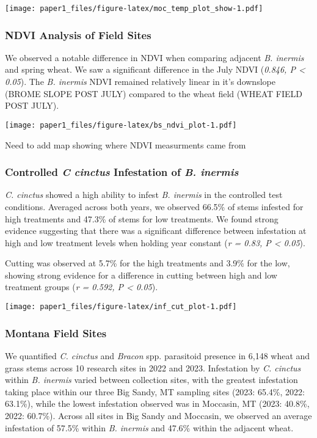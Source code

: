 \documentclass[
]{article}
\begin{document}
\texttt{[image: paper1\_files/figure-latex/moc\_temp\_plot\_show-1.pdf]}

\subsubsection{NDVI Analysis of Field
Sites}\label{ndvi-analysis-of-field-sites}

We observed a notable difference in NDVI when comparing adjacent
\emph{B. inermis} and spring wheat. We saw a significant difference in
the July NDVI (\emph{0.846, P \textless{} 0.05}). The \emph{B. inermis}
NDVI remained relatively linear in it's downslope (BROME SLOPE POST
JULY) compared to the wheat field (WHEAT FIELD POST JULY).

\texttt{[image: paper1\_files/figure-latex/bs\_ndvi\_plot-1.pdf]}

Need to add map showing where NDVI measurments came from

\subsubsection{\texorpdfstring{Controlled \emph{C cinctus} Infestation
of \emph{B.
inermis}}{Controlled C cinctus Infestation of B. inermis}}\label{controlled-c-cinctus-infestation-of-b.-inermis}

\emph{C. cinctus} showed a high ability to infest \emph{B. inermis} in
the controlled test conditions. Averaged across both years, we observed
66.5\% of stems infested for high treatments and 47.3\% of stems for low
treatments. We found strong evidence suggesting that there was a
significant difference between infestation at high and low treatment
levels when holding year constant (\emph{r = 0.83, P \textless{} 0.05}).

Cutting was observed at 5.7\% for the high treatments and 3.9\% for the
low, showing strong evidence for a difference in cutting between high
and low treatment groups (\emph{r = 0.592, P \textless{} 0.05}).

\texttt{[image: paper1\_files/figure-latex/inf\_cut\_plot-1.pdf]}

\subsubsection{Montana Field Sites}\label{montana-field-sites}

We quantified \emph{C. cinctus} and \emph{Bracon} spp. parasitoid
presence in 6,148 wheat and grass stems across 10 research sites in 2022
and 2023. Infestation by \emph{C. cinctus} within \emph{B. inermis}
varied between collection sites, with the greatest infestation taking
place within our three Big Sandy, MT sampling sites (2023: 65.4\%, 2022:
63.1\%), while the lowest infestation observed was in Moccasin, MT
(2023: 40.8\%, 2022: 60.7\%). Across all sites in Big Sandy and
Moccasin, we observed an average infestation of 57.5\% within \emph{B.
inermis} and 47.6\% within the adjacent wheat.
\end{document}
